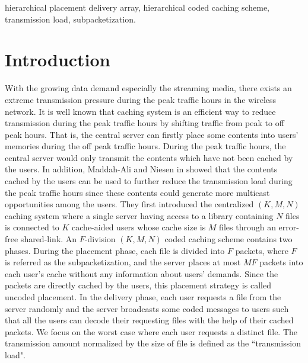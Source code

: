 \documentclass[onecolumn,10pt]{IEEEtran}
\theoremstyle{mythm}
\begin{document}
\begin{IEEEkeywords}
hierarchical placement delivery array, hierarchical coded caching scheme, transmission load, subpacketization.
\end{IEEEkeywords}
\section{Introduction}
With the growing data demand especially the streaming media, there exists an extreme transmission pressure during the peak traffic hours in the wireless network. It is well known that caching system is an efficient way to reduce transmission during the peak traffic hours by shifting traffic from peak to off peak hours. That is, the central server can firstly place some contents into users' memories during the off peak traffic hours. During the peak traffic hours, the central server would only transmit the contents which have not been cached by the users. In addition, Maddah-Ali and Niesen in \cite{MN} showed that the contents cached by the users can be used to further reduce the transmission load during the peak traffic hours since these contents could generate more multicast opportunities among the users. They first introduced the centralized $(K,M,N)$ caching system where a single server having access to a library containing $N$ files is connected to $K$ cache-aided users whose cache size is $M$ files through an error-free shared-link. An $F$-division $(K,M,N)$ coded caching scheme contains two phases. During the placement phase, each file is divided into $F$ packets, where $F$ is referred as the subpacketization, and the server places at most $MF$ packets into each user's cache without any information about   users' demands. Since the packets are directly cached by the users, this placement strategy is called uncoded placement. In the delivery phase, each user requests a file from the server randomly and the server broadcasts some coded messages to users such that all the users can decode their requesting files with the help of their cached packets. We focus on the  worst case where each user requests a distinct file. The transmission amount normalized by the  size of file is defined as the ``transmission load".
\end{document}
